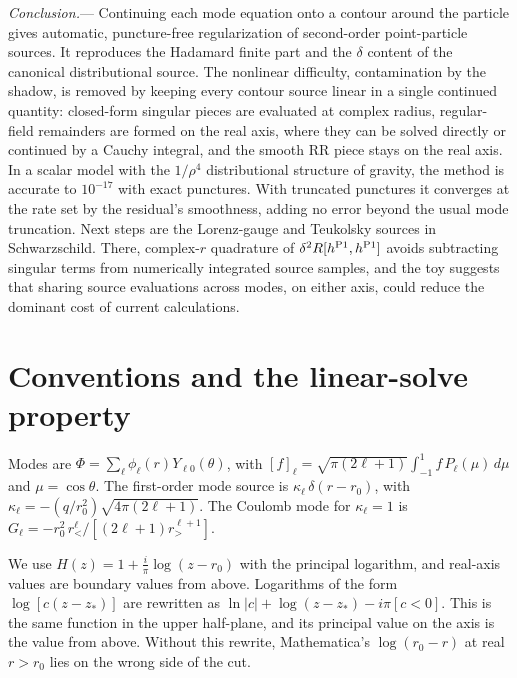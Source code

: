 \documentclass[aps,prl,twocolumn,superscriptaddress,nofootinbib,floatfix]{revtex4-2}
\begin{document}
\emph{Conclusion.}---%
Continuing each mode equation onto a contour around the particle gives automatic, puncture-free regularization of second-order point-particle sources.
It reproduces the Hadamard finite part and the $\delta$ content of the canonical distributional source.
The nonlinear difficulty, contamination by the shadow, is removed by keeping every contour source linear in a single continued quantity: closed-form singular pieces are evaluated at complex radius, regular-field remainders are formed on the real axis, where they can be solved directly or continued by a Cauchy integral, and the smooth RR piece stays on the real axis.
In a scalar model with the $1/\rho^4$ distributional structure of gravity, the method is accurate to $10^{-17}$ with exact punctures.
With truncated punctures it converges at the rate set by the residual's smoothness, adding no error beyond the usual mode truncation.
Next steps are the Lorenz-gauge and Teukolsky sources in Schwarzschild.
There, complex-$r$ quadrature of $\delta^2R[h^{\rm P1},h^{\rm P1}]$ avoids subtracting singular terms from numerically integrated source samples, and the toy suggests that sharing source evaluations across modes, on either axis, could reduce the dominant cost of current calculations.

\begin{acknowledgments}
\end{acknowledgments}

\appendix
\setcounter{secnumdepth}{1}

\section{Conventions and the linear-solve property}\label{app:conventions}
Modes are $\Phi=\sum_\ell\phi_\ell(r)Y_{\ell0}(\theta)$, with $[f]_\ell=\sqrt{\pi(2\ell+1)}\int_{-1}^1 f\,P_\ell(\mu)\,d\mu$ and $\mu=\cos\theta$.
The first-order mode source is $\kappa_\ell\,\delta(r-r_0)$, with $\kappa_\ell=-(q/r_0^2)\sqrt{4\pi(2\ell+1)}$.
The Coulomb mode for $\kappa_\ell=1$ is $G_\ell=-r_0^2\,r_<^\ell/[(2\ell+1)r_>^{\ell+1}]$.

We use $H(z)=1+\tfrac{i}{\pi}\log(z-r_0)$ with the principal logarithm, and real-axis values are boundary values from above.
Logarithms of the form $\log[c(z-z_*)]$ are rewritten as $\ln|c|+\log(z-z_*)-i\pi[c<0]$.
This is the same function in the upper half-plane, and its principal value on the axis is the value from above.
Without this rewrite, Mathematica's $\log(r_0-r)$ at real $r>r_0$ lies on the wrong side of the cut.
\end{document}
